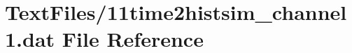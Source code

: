 \hypertarget{11time2histsim__channel1_8dat}{}\section{Text\+Files/11time2histsim\+\_\+channel1.dat File Reference}
\label{11time2histsim__channel1_8dat}
